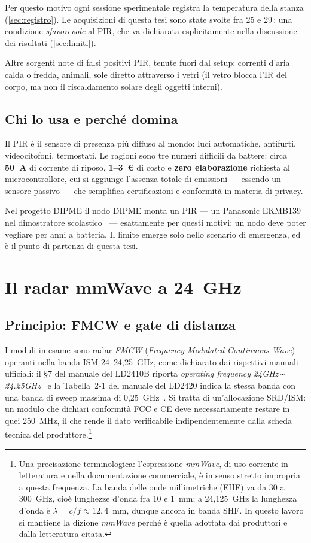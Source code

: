 Per questo motivo ogni sessione sperimentale registra la temperatura della stanza
(\cref{sec:registro}). Le acquisizioni di questa tesi sono state svolte fra 25 e
29\,\celsius: una condizione \emph{sfavorevole} al PIR, che va dichiarata
esplicitamente nella discussione dei risultati (\cref{sec:limiti}).

Altre sorgenti note di falsi positivi PIR, tenute fuori dal setup: correnti d'aria
calda o fredda, animali, sole diretto attraverso i vetri (il vetro blocca l'IR del
corpo, ma non il riscaldamento solare degli oggetti interni).

\subsection{Chi lo usa e perché domina}
\label{sec:pir-usi}

Il PIR è il sensore di presenza più diffuso al mondo: luci automatiche, antifurti,
videocitofoni, termostati. Le ragioni sono tre numeri difficili da battere:
circa \textbf{50~\textmu A} di corrente di riposo, \textbf{1--3~\euro} di costo e
\textbf{zero elaborazione} richiesta al microcontrollore, cui si aggiunge l'assenza
totale di emissioni --- essendo un sensore passivo --- che semplifica
certificazioni e conformità in materia di privacy.

Nel progetto DIPME il nodo DIPME monta un PIR --- un Panasonic EKMB139 nel
dimostratore scolastico~\cite{callisto2026dipme} --- esattamente per questi motivi: un
nodo deve poter vegliare per anni a batteria. Il limite emerge solo nello scenario
di emergenza, ed è il punto di partenza di questa tesi.

\section{Il radar mmWave a 24~GHz}
\label{sec:mmwave}

\subsection{Principio: FMCW e gate di distanza}

I moduli in esame sono radar \emph{FMCW} (\emph{Frequency Modulated Continuous
Wave}) operanti nella banda ISM 24--24,25~GHz, come dichiarato dai rispettivi
manuali ufficiali: il \S7 del manuale del LD2410B riporta
\emph{operating frequency 24GHz\,\textasciitilde\,24.25GHz}~\cite{hilinkManualV104}
e la Tabella~2-1 del manuale del LD2420 indica la stessa banda con una banda di
sweep massima di 0,25~GHz~\cite{hilinkDriveLD2420}. Si tratta di
un'allocazione SRD/ISM: un modulo che dichiari conformità FCC e CE deve
necessariamente restare in quei 250~MHz, il che rende il dato verificabile
indipendentemente dalla scheda tecnica del produttore.\footnote{Una precisazione
terminologica: l'espressione \emph{mmWave}, di uso corrente in letteratura e
nella documentazione commerciale, è in senso stretto impropria a questa
frequenza. La banda delle onde millimetriche (EHF) va da 30 a 300~GHz, cioè
lunghezze d'onda fra 10 e 1~mm; a 24,125~GHz la lunghezza d'onda è
$\lambda = c/f \approx 12{,}4$~mm, dunque ancora in banda SHF. In questo lavoro
si mantiene la dizione \emph{mmWave} perché è quella adottata dai produttori e
dalla letteratura citata.}

